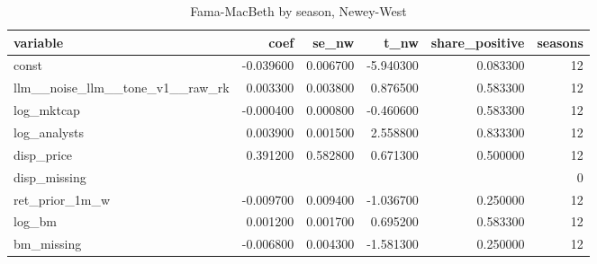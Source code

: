 \begin{table}
\caption{Fama-MacBeth by season, Newey-West}
\label{tab:t8_fama_macbeth__llm__noise_llm__tone_v1__raw__car_0_1_ff4__validation}
\begin{tabular}{lrrrrr}
\toprule
variable & coef & se\_nw & t\_nw & share\_positive & seasons \\
\midrule
const & -0.039600 & 0.006700 & -5.940300 & 0.083300 & 12 \\
llm\_\_noise\_llm\_\_tone\_v1\_\_raw\_rk & 0.003300 & 0.003800 & 0.876500 & 0.583300 & 12 \\
log\_mktcap & -0.000400 & 0.000800 & -0.460600 & 0.583300 & 12 \\
log\_analysts & 0.003900 & 0.001500 & 2.558800 & 0.833300 & 12 \\
disp\_price & 0.391200 & 0.582800 & 0.671300 & 0.500000 & 12 \\
disp\_missing &  &  &  &  & 0 \\
ret\_prior\_1m\_w & -0.009700 & 0.009400 & -1.036700 & 0.250000 & 12 \\
log\_bm & 0.001200 & 0.001700 & 0.695200 & 0.583300 & 12 \\
bm\_missing & -0.006800 & 0.004300 & -1.581300 & 0.250000 & 12 \\
\bottomrule
\end{tabular}
\end{table}
